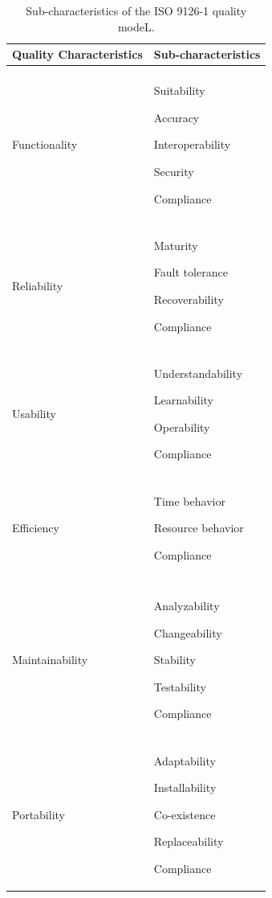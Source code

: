 \begin{table}[h!]
    \caption{Sub-characteristics of the ISO 9126-1 quality modeL.}
	\begin{tabularx}{\textwidth}{X | X }
	    \textbf{Quality Characteristics} & \textbf{Sub-characteristics}	
	    \\ \hline
		\\ %
		Functionality
        & Suitability
        
        Accuracy
        
        Interoperability 
        
        Security
        
        Compliance			 
		
		\\ \hline
	     \\ %
		Reliability    
        
        &  Maturity 
        
        Fault tolerance 
        
        Recoverability 
        
        Compliance
		
		\\ \hline
	     \\ %
	    Usability       
        
        & Understandability 
        
        Learnability 
        
        Operability 
        
        Compliance
    
	    \\ \hline
	  \\ %
	   Efficiency &  Time behavior 
        
        Resource behavior 
        
        Compliance    
        \\ %
	    \\ \hline
	    \\ %
	    
	   Maintainability	
       
       & Analyzability 
        
        Changeability 
        
        Stability 
        
        Testability 
        
        Compliance
        
	    \\ \hline
	    \\ %
	    
	   Portability	
       
       & Adaptability
       
       Installability 
       
       Co-existence
       
       Replaceability 
       
       Compliance
        	   
	\end{tabularx}
	\label{tab:table1}
	
\end{table}


